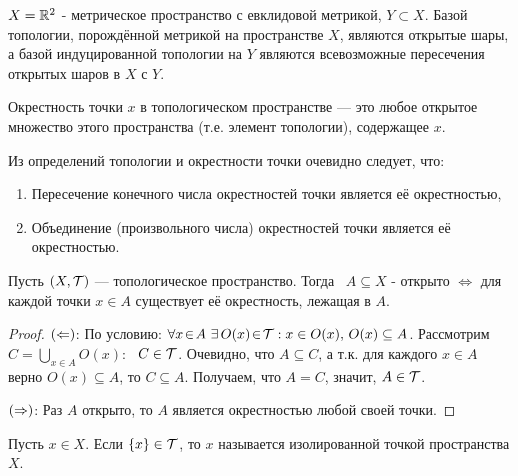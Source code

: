 \begin{example}
    $X = \mathbb{R}^2$ - метрическое пространство с евклидовой метрикой, $Y \subset X$. Базой топологии, порождённой метрикой на пространстве $X$, являются открытые шары, а базой индуцированной топологии на $Y$ являются всевозможные пересечения открытых шаров в $X$ с $Y$.
\end{example}

\begin{definition}
    Окрестность точки $x$ в топологическом пространстве --- это любое открытое множество этого пространства (т.е. элемент топологии), содержащее $x$.
\end{definition}

\begin{nota_bene} Из определений топологии и окрестности точки очевидно следует, что:
    \begin{enumerate}
        \item Пересечение конечного числа окрестностей точки является её окрестностью,
        \item Объединение (произвольного числа) окрестностей точки является её окрестностью.
    \end{enumerate}
\end{nota_bene}

\begin{statement}
    Пусть $(X, \mathcal{T})$ --- топологическое пространство. Тогда \ $A \subseteq X$ - открыто $\Leftrightarrow$ для каждой точки $x \in A$ существует её окрестность, лежащая в $A$.
\end{statement}
\begin{proof}
    
    $\left(\Leftarrow\right)$: По условию: $\forall x \! \in \! A \ \exists \, O(x) \! \in \! \mathcal{T}: x \in O(x), \, O(x) \subseteq A$. Рассмотрим $C = \bigcup_{x \in A} O(x)$: \ $C \in \mathcal{T}$. 
    Очевидно, что $A \subseteq C$, а т.к. для каждого $x \in A$ верно $O(x) \subseteq A$, то $C \subseteq A$. Получаем, что $A = C$, значит, $A \in \mathcal{T}$.

    $\left(\Rightarrow\right)$: Раз $A$ открыто, то $A$ является окрестностью любой своей точки.
\end{proof}

\begin{definition}
    Пусть $x \in X$. Если $\left\{x\right\} \in \mathcal{T}$, то $x$ называется изолированной точкой пространства $X$.
\end{definition}

